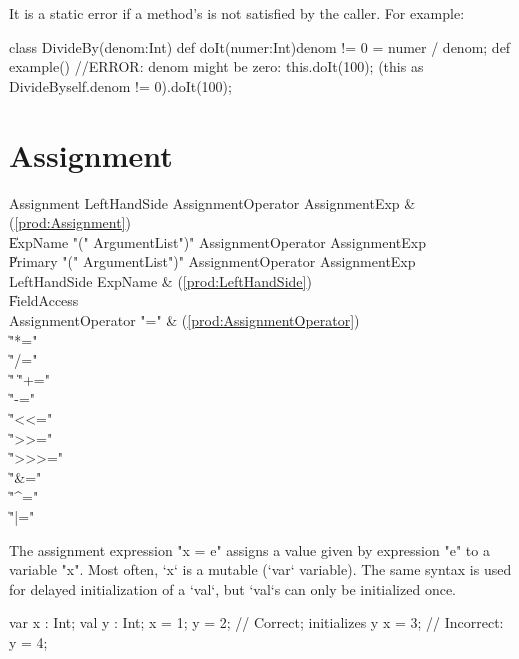 It is a static error if a method's  is not satisfied by the
caller.  For example: 
\begin{xten}
class DivideBy(denom:Int) {
  def doIt(numer:Int){denom != 0} = numer / denom;
  def example() {
     //ERROR: denom might be zero: this.doIt(100); 
     (this as DivideBy{self.denom != 0}).doIt(100);
  }
}
\end{xten}
%


\section{Assignment}\label{AssignmentStatement}

\begin{bbgrammar}
 Assignment    \: LeftHandSide AssignmentOperator AssignmentExp & (\ref{prod:Assignment})\\%
    \| ExpName  \xcd"(" ArgumentList\opt \xcd")" AssignmentOperator AssignmentExp\\
    \| Primary  \xcd"(" ArgumentList\opt \xcd")" AssignmentOperator AssignmentExp\\
 LeftHandSide    \: ExpName & (\ref{prod:LeftHandSide})\\%
    \| FieldAccess\\
 AssignmentOperator    \: \xcd"=" & (\ref{prod:AssignmentOperator})\\%
    \| \xcd"*="\\
    \| \xcd"/="\\
    \| \xcd"%
    \| \xcd"+="\\
    \| \xcd"-="\\
    \| \xcd"<<="\\
    \| \xcd">>="\\
    \| \xcd">>>="\\
    \| \xcd"&="\\
    \| \xcd"^="\\
    \| \xcd"|="
\end{bbgrammar}




The assignment expression \xcd"x = e" assigns a value given by
expression \xcd"e"
to a variable \xcd"x".  
Most often, \xcd`x` is a mutable (\xcd`var` variable).  The same syntax is
used for delayed initialization of a \xcd`val`, but \xcd`val`s can only be
initialized once.
\begin{xten}
  var x : Int;
  val y : Int;
  x = 1;
  y = 2; // Correct; initializes y
  x = 3; 
  // Incorrect: y = 4;
\end{xten}



